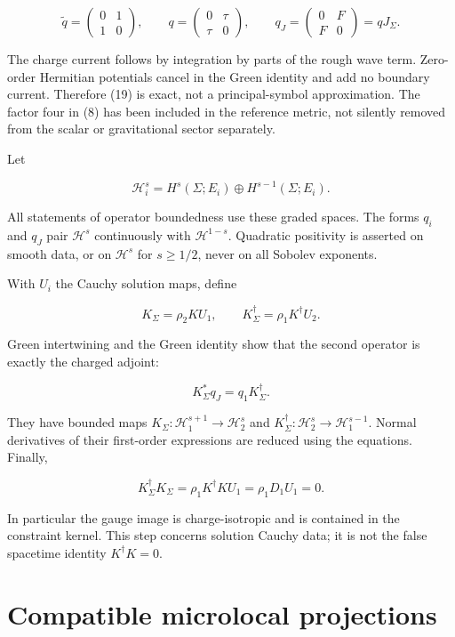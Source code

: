 \[
 \widetilde q=\begin{pmatrix}0&1\\1&0\end{pmatrix},\qquad
 q=\begin{pmatrix}0&\tau\\\tau&0\end{pmatrix},\qquad
 q_J=\begin{pmatrix}0&F\\F&0\end{pmatrix}=qJ_\Sigma.
 \tag{19}
\]

The charge current follows by integration by parts of the rough wave term. Zero-order Hermitian potentials cancel in the Green identity and add no boundary current. Therefore (19) is exact, not a principal-symbol approximation. The factor four in (8) has been included in the reference metric, not silently removed from the scalar or gravitational sector separately.

Let

\[
 \mathcal H_i^s=H^s(\Sigma;E_i)\oplus H^{s-1}(\Sigma;E_i).
\]

All statements of operator boundedness use these graded spaces. The forms $q_i$ and $q_J$ pair $\mathcal H^s$ continuously with $\mathcal H^{1-s}$. Quadratic positivity is asserted on smooth data, or on $\mathcal H^s$ for $s\ge1/2$, never on all Sobolev exponents.

With $U_i$ the Cauchy solution maps, define

\[
 K_\Sigma=\rho_2KU_1,\qquad
 K_\Sigma^\dagger=\rho_1K^\dagger U_2.
 \tag{20}
\]

Green intertwining and the Green identity show that the second operator is exactly the charged adjoint:

\[
 K_\Sigma^*q_J=q_1K_\Sigma^\dagger.
 \tag{21}
\]

They have bounded maps $K_\Sigma:\mathcal H_1^{s+1}\to\mathcal H_2^s$ and $K_\Sigma^\dagger:\mathcal H_2^s\to\mathcal H_1^{s-1}$. Normal derivatives of their first-order expressions are reduced using the equations. Finally,

\[
 K_\Sigma^\dagger K_\Sigma
 =\rho_1K^\dagger KU_1=\rho_1D_1U_1=0.
 \tag{22}
\]

In particular the gauge image is charge-isotropic and is contained in the constraint kernel. This step concerns solution Cauchy data; it is not the false spacetime identity $K^\dagger K=0$.

\section{Compatible microlocal projections}

